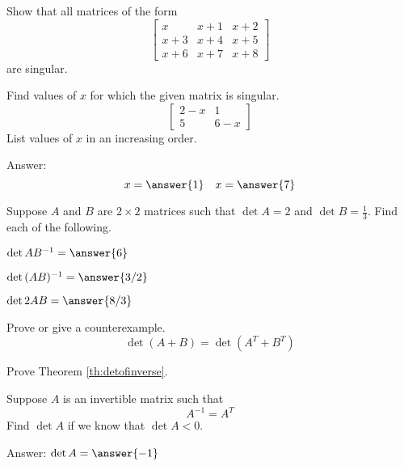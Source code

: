 \documentclass{ximera}
\begin{document}
\begin{problem} Show that all matrices of the form
$$\begin{bmatrix}x&x+1&x+2\\x+3&x+4&x+5\\x+6&x+7&x+8\end{bmatrix}$$
are singular.
\end{problem}

\begin{problem}
Find values of $x$ for which the given matrix is singular.
$$\begin{bmatrix}2-x&1\\5&6-x\end{bmatrix}$$
List values of $x$ in an increasing order.

Answer:
$$x=\answer{1}\quad x=\answer{7}$$
\end{problem}

\begin{problem}
Suppose $A$ and $B$ are $2\times 2$ matrices such that $\det{A}=2$ and $\det{B}=\frac{1}{3}$.  Find each of the following.
  \begin{problem}
  $\det{AB^{-1}}=\answer{6}$
  \end{problem}
  
   \begin{problem}
  $\det{(AB)^{-1}}=\answer{3/2}$
  \end{problem}
  
   \begin{problem}
  $\det{2AB}=\answer{8/3}$
  \end{problem}
\end{problem}

\begin{problem}
Prove or give a counterexample.
   $$\det{(A+B)}=\det{(A^T+B^T)}$$
  
\end{problem}

\begin{problem}
Prove Theorem \ref{th:detofinverse}.
\end{problem}

\begin{problem}
Suppose $A$ is an invertible matrix such that $$A^{-1}=A^T$$
Find $\det{A}$ if we know that $\det{A}<0$.

Answer: $\det{A}=\answer{-1}$
\end{problem}
\end{document}
